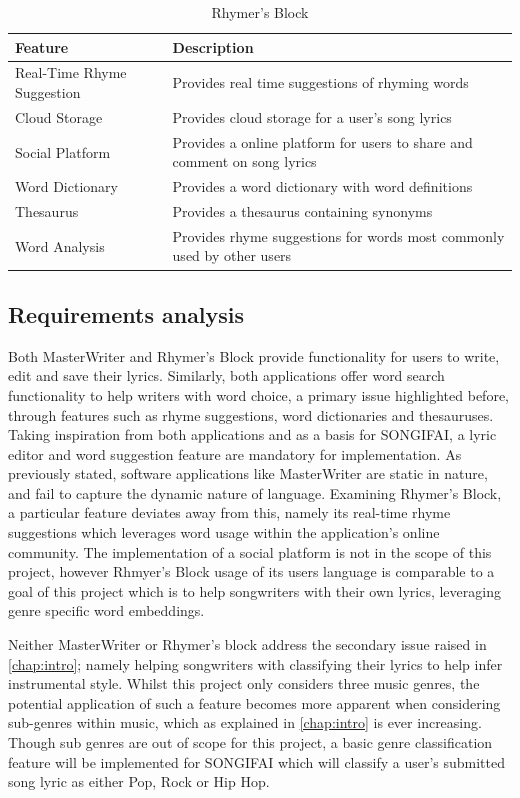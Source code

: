 \begin{table}[ht]
	\centering
	\begin{tabular}{ | l | p{10cm} |}
		\hline
		\textbf{Feature} & \textbf{Description}\\ \hline
		Real-Time Rhyme Suggestion & Provides real time suggestions of rhyming words \\ \hline
		Cloud Storage & Provides cloud storage for a user's song lyrics \\ \hline
		Social Platform & Provides a online platform for users to share and comment on song lyrics\\ \hline
		Word Dictionary & Provides a word dictionary with word definitions \\ \hline
		Thesaurus & Provides a thesaurus containing synonyms\\ \hline
		Word Analysis & Provides rhyme suggestions for words most commonly used by other users \\ \hline
	\end{tabular}
	\label{Tab:RhymersBlock}
	\caption{Rhymer's Block}
\end{table}

\subsection{Requirements analysis}
Both MasterWriter and Rhymer's Block provide functionality for users to write, edit and save their lyrics. Similarly, both applications offer word search functionality to help writers with word choice, a primary issue highlighted before, through features such as rhyme suggestions, word dictionaries and thesauruses. Taking inspiration from both applications and as a basis for SONGIFAI, a lyric editor and word suggestion feature are mandatory for implementation. As previously stated, software applications like MasterWriter are static in nature, and fail to capture the dynamic nature of language. Examining Rhymer's Block, a particular feature deviates away from this, namely its real-time rhyme suggestions which leverages word usage within the application's online community. The implementation of a social platform is not in the scope of this project, however Rhmyer's Block usage of its users language is comparable to a goal of this project which is to help songwriters with their own lyrics, leveraging genre specific word embeddings.

\noindent
\newline
Neither MasterWriter or Rhymer's block address the secondary issue raised in \autoref{chap:intro}; namely helping songwriters with classifying their lyrics to help infer instrumental style. Whilst this project only considers three music genres, the potential application of such a feature becomes more apparent when considering sub-genres within music, which as explained in \autoref{chap:intro} is ever increasing. Though sub genres are out of scope for this project, a basic genre classification feature will be implemented for SONGIFAI which will classify a user's submitted song lyric as either Pop, Rock or Hip Hop.

